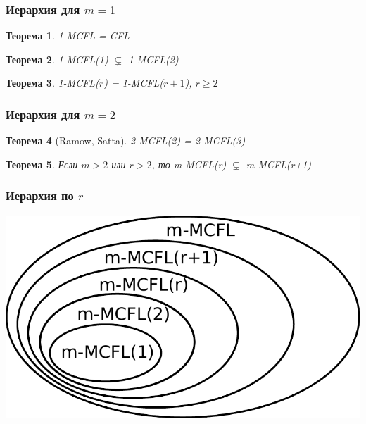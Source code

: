 \documentclass{beamer}
\newtheorem{rutheorem}{Теорема}
\begin{document}
\begin{frame}[fragile]

 \frametitle{Иерархия для $m=1$}
 \begin{rutheorem}
  1-MCFL = CFL
 \end{rutheorem}
\pause
 \begin{rutheorem}
  1-MCFL(1) $\varsubsetneq$ 1-MCFL(2)
 \end{rutheorem}
 \pause
 \begin{rutheorem}
  1-MCFL($r$) = 1-MCFL($r+1$), $r\geq2$
 \end{rutheorem}

\end{frame}


\begin{frame}[fragile]

 \frametitle{Иерархия для $m=2$}
 \begin{rutheorem}[Ramow, Satta]
  2-MCFL(2) = 2-MCFL(3)
 \end{rutheorem}

 \begin{rutheorem}
 Если $m>2$ или $r>2$, то m-MCFL(r) $\varsubsetneq$ m-MCFL(r+1)
 \end{rutheorem}

\end{frame}


\begin{frame}[fragile]

  \frametitle{Иерархия по $r$}

  \includegraphics[width=\textwidth]{pics/mcfg_2.pdf}

\end{frame}
\end{document}
